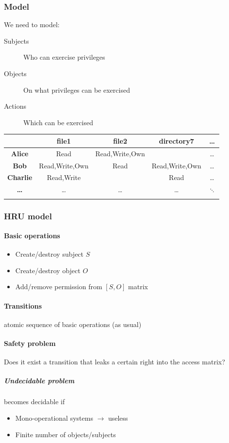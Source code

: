 \documentclass{article}
\begin{document}
\subsubsection{Model}
We need to model:
\begin{description}
\item[Subjects] Who can exercise privileges
\item[Objects] On what privileges can be exercised
\item[Actions] Which can be exercised
\end{description}
\begin{tabular}{|c|c|c|c|c:}
\hline
&\textbf{file1}&\textbf{file2}&\textbf{directory7}&\textbf{\dots}\\
\hline
\textbf{Alice}&Read&Read,Write,Own&&\dots\\
\textbf{Bob}&Read,Write,Own&Read&Read,Write,Own&\dots\\
\textbf{Charlie}&Read,Write&&Read&\dots\\
\textbf{\dots}&\dots&\dots&\dots&$\ddots$\\
\hdashline
\end{tabular}
\subsubsection{HRU model}
\paragraph{Basic operations}
\begin{itemize}
\item Create/destroy subject $S$
\item Create/destroy object $O$
\item Add/remove permission from $[S,O]$ matrix
\end{itemize}
\paragraph{Transitions} atomic sequence of basic operations (as usual)
\paragraph{Safety problem} Does it exist a transition that leaks a certain right into the access matrix?
\subparagraph{Undecidable problem} becomes decidable if
\begin{itemize}
\item Mono-operational systems $\rightarrow$ useless
\item Finite number of objects/subjects
\end{itemize}
\end{document}
